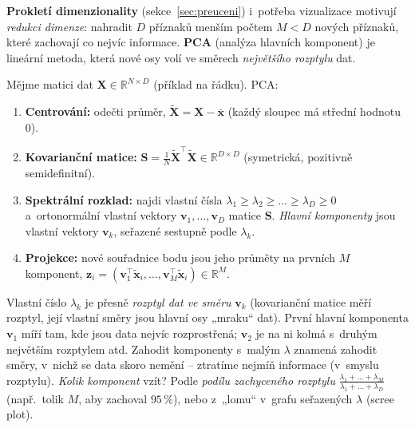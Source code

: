 \textbf{Prokletí dimenzionality} (sekce~\ref{sec:preuceni}) i~potřeba vizualizace motivují \emph{redukci dimenze}: nahradit $D$ příznaků menším počtem $M<D$ nových příznaků, které zachovají co nejvíc informace. \textbf{PCA} (analýza hlavních komponent) je lineární metoda, která nové osy volí ve směrech \emph{největšího rozptylu} dat.

\begin{definice}
Mějme matici dat $\mathbf{X}\in\mathbb{R}^{N\times D}$ (příklad na řádku). PCA:
\begin{enumerate}
  \item \textbf{Centrování:} odečti průměr, $\tilde{\mathbf{X}}=\mathbf{X}-\bar{\mathbf{x}}$ (každý sloupec má střední hodnotu $0$).
  \item \textbf{Kovarianční matice:} $\mathbf{S}=\frac1N\tilde{\mathbf{X}}^{\!\top}\tilde{\mathbf{X}}\in\mathbb{R}^{D\times D}$ (symetrická, pozitivně semidefinitní).
  \item \textbf{Spektrální rozklad:} najdi vlastní čísla $\lambda_1\ge\lambda_2\ge\dots\ge\lambda_D\ge0$ a~ortonormální vlastní vektory $\mathbf{v}_1,\dots,\mathbf{v}_D$ matice $\mathbf{S}$. \emph{Hlavní komponenty} jsou vlastní vektory $\mathbf{v}_k$, seřazené sestupně podle $\lambda_k$.
  \item \textbf{Projekce:} nové souřadnice bodu jsou jeho průměty na prvních $M$ komponent, $\mathbf{z}_i=(\mathbf{v}_1^{\!\top}\tilde{\mathbf{x}}_i,\dots,\mathbf{v}_M^{\!\top}\tilde{\mathbf{x}}_i)\in\mathbb{R}^M$.
\end{enumerate}
\end{definice}

\begin{intuice}
Vlastní číslo $\lambda_k$ je přesně \emph{rozptyl dat ve směru} $\mathbf{v}_k$ (kovarianční matice měří rozptyl, její vlastní směry jsou hlavní osy „mraku`` dat). První hlavní komponenta $\mathbf{v}_1$ míří tam, kde jsou data nejvíc rozprostřená; $\mathbf{v}_2$ je na ni kolmá s~druhým největším rozptylem atd. Zahodit komponenty s~malým $\lambda$ znamená zahodit směry, v~nichž se data skoro nemění -- ztratíme nejmíň informace (v~smyslu rozptylu). \emph{Kolik komponent} vzít? Podle \emph{podílu zachyceného rozptylu} $\frac{\lambda_1+\dots+\lambda_M}{\lambda_1+\dots+\lambda_D}$ (např.\ tolik $M$, aby zachoval $95\,\%$), nebo z~„lomu`` v~grafu seřazených $\lambda$ (scree plot).
\end{intuice}

